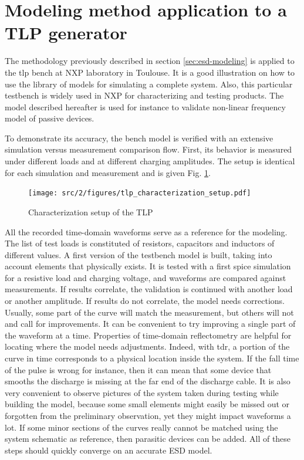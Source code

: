 \section{Modeling method application to a TLP generator}
\label{sec:tlp-modeling}

The methodology previously described in section \ref{sec:esd-modeling} is applied to the \gls{tlp} bench at NXP laboratory in Toulouse.
It is a good illustration on how to use the library of models for simulating a complete system.
Also, this particular testbench is widely used in NXP for characterizing and testing products.
The model described hereafter is used for instance to validate non-linear frequency model of passive devices.

To demonstrate its accuracy, the bench model is verified with an extensive simulation versus measurement comparison flow.
First, its behavior is measured under different loads and at different charging amplitudes.
The setup is identical for each simulation and measurement and is given Fig. \ref{fig:setup-cz-tlp-model}.

\begin{figure}[!h]
  \centering
  \texttt{[image: src/2/figures/tlp\_characterization\_setup.pdf]}
  \caption{Characterization setup of the TLP}
  \label{fig:setup-cz-tlp-model}
\end{figure}

All the recorded time-domain waveforms serve as a reference for the modeling.
The list of test loads is constituted of resistors, capacitors and inductors of different values.
A first version of the testbench model is built, taking into account elements that physically exists.
It is tested with a first \gls{spice} simulation for a resistive load and charging voltage, and waveforms are compared against measurements.
If results correlate, the validation is continued with another load or another amplitude.
If results do not correlate, the model needs corrections.
Usually, some part of the curve will match the measurement, but others will not and call for improvements.
It can be convenient to try improving a single part of the waveform at a time.
Properties of time-domain reflectometry are helpful for locating where the model needs adjustments.
Indeed, with \gls{tdr}, a portion of the curve in time corresponds to a physical location inside the system.
If the fall time of the pulse is wrong for instance, then it can mean that some device that smooths the discharge is missing at the far end of the discharge cable.
It is also very convenient to observe pictures of the system taken during testing while building the model, because some small elements might easily be missed out or forgotten from the preliminary observation, yet they might impact waveforms a lot.
If some minor sections of the curves really cannot be matched using the system schematic as reference, then parasitic devices can be added.
All of these steps should quickly converge on an accurate ESD model.

